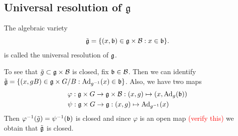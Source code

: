 \subsection{\texorpdfstring{Universal resolution of $\mathfrak{g}$}{Universal resolution of }}
\begin{dang}
    \begin{definition}
        The  algebraic variety 
        \begin{equation}
            \tilde{\mathfrak{g}} = \{(x,\mathfrak{b})\in\mathfrak{g}\times\mathcal{B}:x\in\mathfrak{b}\}.
        \end{equation}
        is called the universal resolution of $\mathfrak{g}$.
    \end{definition}
\end{dang}
To see that $\tilde{g}\subset \mathfrak{g}\times\mathcal{B}$ is closed, fix $\mathfrak{b}\in\mathcal{B}$. Then we can identify 
$\tilde{\mathfrak{g}}=\{(x,gB)\in\mathfrak{g}\times G/B: \text{Ad}_{g^{-1}}(x)\in\mathfrak{b}\}$. Also, we have two maps 
\begin{equation}
    \begin{split}
        &\varphi:\mathfrak{g}\times G\to \mathfrak{g}\times\mathcal{B}:(x,g)\mapsto (x,\text{Ad}_g(\mathfrak{b}))\\
        &\psi:\mathfrak{g}\times G\to \mathfrak{g}: (x,g)\mapsto \text{Ad}_{g^{-1}}(x)
    \end{split}
\end{equation}
Then $\varphi^{-1}(\tilde{g})=\psi^{-1}(\mathfrak{b})$ is closed and since $\varphi$ is an open map 
\textcolor{red}{(verify this)} we obtain that $\tilde{\mathfrak{g}}$ is closed.

